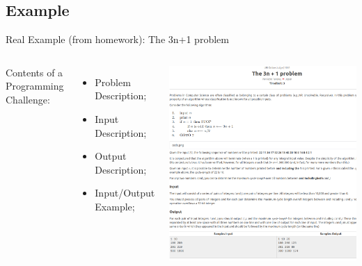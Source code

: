 \subsection{Example}
\begin{frame}{Real Example (from homework): The 3n+1 problem}
  \begin{columns}
      Contents of a Programming Challenge:
      \begin{itemize}
        \item Problem Description;
        \item Input Description;
        \item Output Description;
        \item Input/Output Example;
      \end{itemize}

    \includegraphics[width=1\textwidth]{img/3n_problem}
  \end{columns}
\end{frame}

